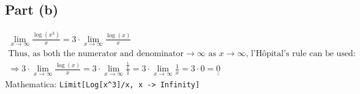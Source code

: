 \documentclass[letterpaper,10pt]{article}
\newcommand{\doubleu}[1]{\underline{\underline{#1}}}
\newcommand{\mathematica}[1]{Mathematica: \texttt{#1}}
\begin{document}
		\subsection{Part (b)}
			\begin{gather*}
				\lim_{x \rightarrow \infty} \frac{\log (x^3)}{x}
				= 3 \cdot \lim_{x \rightarrow \infty} \frac{\log (x)}{x} \\
				\text{Thus, as both the numerator and denominator} \rightarrow \infty \text{ as } x \rightarrow \infty \text{, l'H\^opital's rule can be used:} \\
				\Rightarrow 3 \cdot \lim_{x \rightarrow \infty} \frac{\log (x)}{x}
				= 3 \cdot \lim_{x \rightarrow \infty} \frac{\frac{1}{x}}{1}
				= 3 \cdot \lim_{x \rightarrow \infty} \frac{1}{x}
				= 3 \cdot 0
				= \doubleu{0}
			\end{gather*}
			\mathematica{Limit[Log[x\^{}3]/x, x -> Infinity]}
\end{document}
